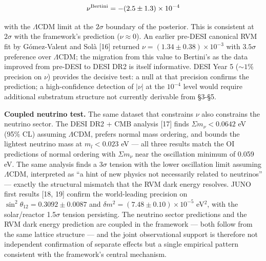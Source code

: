 \documentclass[
]{article}
\begin{document}
\[\nu^{\rm Bertini} = -(2.5 \pm 1.3) \times 10^{-4}\]

with the \(\Lambda\)CDM limit at the \(2\sigma\) boundary of the
posterior. This is consistent at \(2\sigma\) with the framework's
prediction (\(\nu \approx 0\)). An earlier pre-DESI canonical RVM fit by
Gómez-Valent and Solà {[}16{]} returned
\(\nu = (1.34 \pm 0.38) \times 10^{-3}\) with \(3.5\sigma\) preference
over \(\Lambda\)CDM; the migration from this value to Bertini's as the
data improved from pre-DESI to DESI DR2 is itself informative. DESI Year
5 (\(\sim 1\%\) precision on \(\nu\)) provides the decisive test: a null
at that precision confirms the prediction; a high-confidence detection
of \(|\nu|\) at the \(10^{-4}\) level would require additional
substratum structure not currently derivable from §3-§5.

\textbf{Coupled neutrino test.} The same dataset that constrains \(\nu\)
also constrains the neutrino sector. The DESI DR2 + CMB analysis
{[}17{]} finds \(\Sigma m_\nu < 0.0642\) eV (95\% CL) assuming
\(\Lambda\)CDM, prefers normal mass ordering, and bounds the lightest
neutrino mass at \(m_l < 0.023\) eV --- all three results match the OI
predictions of normal ordering with \(\Sigma m_\nu\) near the
oscillation minimum of 0.059 eV. The same analysis finds a \(3\sigma\)
tension with the lower oscillation limit assuming \(\Lambda\)CDM,
interpreted as ``a hint of new physics not necessarily related to
neutrinos'' --- exactly the structural mismatch that the RVM dark energy
resolves. JUNO first results {[}18, 19{]} confirm the world-leading
precision on \(\sin^2\theta_{12} = 0.3092 \pm 0.0087\) and
\(\delta m^2 = (7.48 \pm 0.10) \times 10^{-5}\) eV\(^2\), with the
solar/reactor 1.5\(\sigma\) tension persisting. The neutrino sector
predictions and the RVM dark energy prediction are coupled in the
framework --- both follow from the same lattice structure --- and the
joint observational support is therefore not independent confirmation of
separate effects but a single empirical pattern consistent with the
framework's central mechanism.
\end{document}
